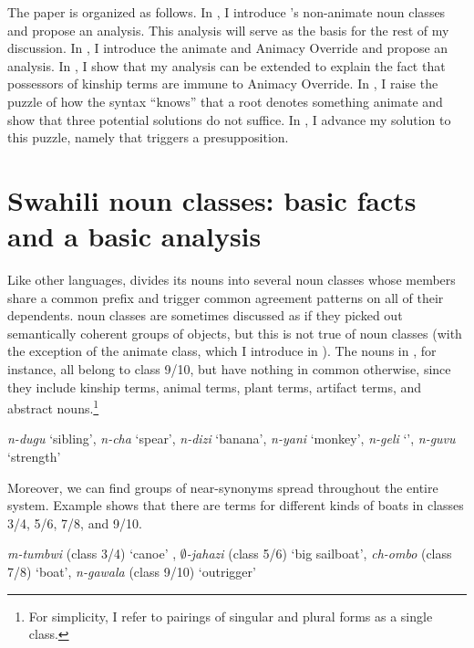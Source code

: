 \documentclass[output=paper
,newtxmath
,modfonts
,nonflat]{langsci/langscibook}
\begin{document}
The paper is organized as follows.  In , I introduce 's non-animate noun classes and propose an analysis.  This analysis will serve as the basis for the rest of my discussion.  In , I introduce the animate  and Animacy Override and propose an analysis.  In , I show that my analysis can be extended to explain the fact that possessors of kinship terms are immune to Animacy Override.  In , I raise the puzzle of how the syntax ``knows'' that a root denotes something animate and show that three potential solutions do not suffice.  In , I advance my solution to this puzzle, namely that  triggers a presupposition.

\section{Swahili noun classes: basic facts and a basic analysis}\label{snc:pesetsky:snc}

Like other  languages,  divides its nouns into several noun classes whose members share a common prefix and trigger common agreement patterns on all of their dependents.   noun classes are sometimes discussed as if they picked out semantically coherent groups of objects, but this is not true of  noun classes (with the exception of the animate class, which I introduce in ).  The nouns in , for instance, all belong to class 9/10, but have nothing in common otherwise, since they include kinship terms, animal terms, plant terms, artifact terms, and abstract nouns.\footnote{For simplicity, I refer to pairings of singular and plural forms as a single class.}

\ea\label{ex:pesetsky:deadstuff}{ \textit{n-dugu} `sibling', \textit{n-cha} `spear', \textit{n-dizi} `banana', \textit{n-yani} `monkey', \textit{n-geli} `', \textit{n-guvu} `strength' } \z

Moreover, we can find groups of near-synonyms spread throughout the entire   system. Example  shows that there are terms for different kinds of boats in classes 3/4, 5/6, 7/8, and 9/10.

\ea\label{ex:pesetsky:boats} \textit{m-tumbwi} (class 3/4) `canoe' , \textit{$\emptyset$-jahazi} (class 5/6) `big sailboat', \textit{ch-ombo} (class 7/8) `boat', \textit{n-gawala} (class 9/10) `outrigger'  \z 
\end{document}
